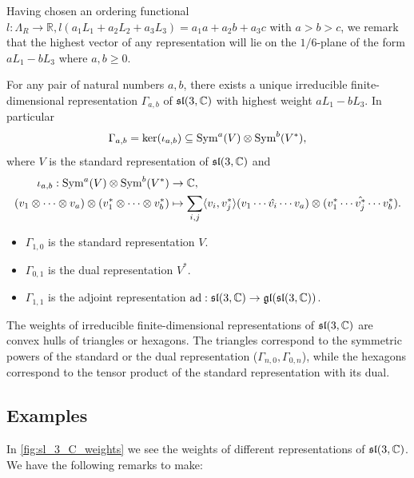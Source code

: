 \documentclass{report}
\begin{document}
Having chosen an ordering functional $l: \Lambda_R \to \mathbb R, l(a_1 L_1 + a_2 L_2 + a_3 L_3) = a_1 a + a_2 b + a_3 c$ with $a > b > c$, we remark that the highest vector of any representation will lie on the $1/6$-plane of the form $ a L_1 - b L_3$ where $a, b \geq 0$.
\begin{theorem}\label{thm:irreducible_representations_of_sl_3_C}
    For any pair of natural numbers $a, b$, there exists a unique irreducible finite-dimensional representation $\Gamma_{a,b}$ of $\operatorname{{\mathfrak{sl}}}(3, \mathbb C)$ with highest weight $a L_1 - b L_3$.
    In particular
    \[
    \Gamma_{a,b} = \ker(\iota_{a,b}) \subseteq \operatorname{Sym}^a(V) \otimes \operatorname{Sym}^b(V^*),
    \]
    where $V$ is the standard representation of $\operatorname{{\mathfrak{sl}}}(3, \mathbb C)$ and
    \begin{align*}
        \iota_{a,b}: \operatorname{Sym}^a(V) \otimes \operatorname{Sym}^b(V^*) &\to \mathbb C, \nonumber \\
        (v_1 \otimes \cdots \otimes v_a) \otimes (v_1^* \otimes \cdots \otimes v_b^*) &\mapsto \sum_{i,j} \langle v_i, v_j^* \rangle (v_1 \cdots \hat{v_i} \cdots v_a) \otimes (v_1^* \cdots \hat{v_j^*} \cdots v_b^*).
    \end{align*}
\end{theorem}

\begin{example}
    \begin{itemize}
        \item $\Gamma_{1,0}$ is the standard representation $V$.
        \item $\Gamma_{0,1}$ is the dual representation $V^*$.
        \item $\Gamma_{1,1}$ is the adjoint representation $\operatorname{ad}: \operatorname{{\mathfrak{sl}}}(3, \mathbb C) \to \operatorname{{\mathfrak{gl}}}(\operatorname{{\mathfrak{sl}}}(3, \mathbb C))$.
    \end{itemize}
\end{example}

\begin{fact}
    The weights of irreducible finite-dimensional representations of $\operatorname{{\mathfrak{sl}}}(3, \mathbb C)$ are convex hulls of triangles or hexagons.
    The triangles correspond to the symmetric powers of the standard or the dual representation ($\Gamma_{n,0}, \Gamma_{0,n}$), while the hexagons correspond to the tensor product of the standard representation with its dual.
\end{fact}

\subsection{Examples}
In \cref{fig:sl_3_C_weights} we see the weights of different representations of $\operatorname{{\mathfrak{sl}}}(3, \mathbb C)$.
We have the following remarks to make:
\end{document}
